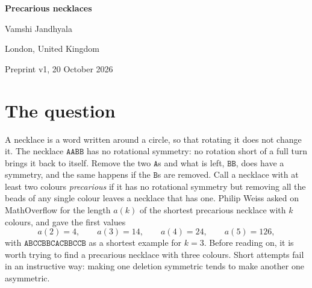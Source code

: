 \documentclass[11pt,a4paper]{article}
\theoremstyle{remark}
\begin{document}
\raggedbottom
\begin{center}
{\LARGE\bfseries Precarious necklaces\par}
\vspace{10pt}
{\large Vamshi Jandhyala\par}
\vspace{2pt}
{\small London, United Kingdom\par}
\vspace{4pt}
{\small Preprint v1, 20 October 2026\par}
\end{center}
\vspace{6pt}
\begin{abstract}
A necklace of coloured beads is precarious if it has no rotational
symmetry, yet removing all the beads of any one colour leaves a necklace
that does. We show that the shortest precarious necklace with $k$ colours
has length $2m\,P_m$ when $k=2m$ and $P_m(2m\,p_{m+1}+1)$ when $k=2m+1$,
where $p_i$ is the $i$-th prime and $P_m=p_1\cdots p_m$. The same method
answers the whole family of questions in which one keeps any $s$ of the
$k$ colours: the minimum is $s\,P_{\lfloor s/2\rfloor+1}+(k-s)\,P_{\lceil
s/2\rceil}$. The key fact is that a word is a $q$-th power as soon as all
its two-letter projections are. Every result is formalised in Lean.
\end{abstract}

\section{The question}

A necklace is a word written around a circle, so that rotating it does
not change it. The necklace $\mathtt{AABB}$ has no rotational symmetry:
no rotation short of a full turn brings it back to itself. Remove the two
$\mathtt{A}$s and what is left, $\mathtt{BB}$, does have a symmetry, and
the same happens if the $\mathtt{B}$s are removed. Call a necklace with at
least two colours \emph{precarious} if it has no rotational symmetry but
removing all the beads of any single colour leaves a necklace that has
one. Philip Weiss asked on MathOverflow \cite{MO} for the length $a(k)$ of
the shortest precarious necklace with $k$ colours, and gave the first
values
\[
a(2)=4,\qquad a(3)=14,\qquad a(4)=24,\qquad a(5)=126,
\]
with $\mathtt{ABCCBBCACBBCCB}$ as a shortest example for $k=3$. Before
reading on, it is worth trying to find a precarious necklace with three
colours. Short attempts fail in an instructive way: making one deletion
symmetric tends to make another one asymmetric.
\end{document}
